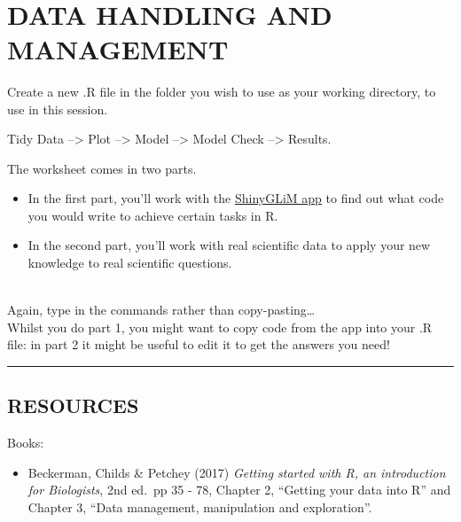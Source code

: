 \documentclass[
]{book}
\providecommand{\tightlist}{%
  \setlength{\itemsep}{0pt}\setlength{\parskip}{0pt}}
\begin{document}
~
~

\hypertarget{data-handling-and-management}{%
\chapter{DATA HANDLING AND MANAGEMENT}\label{data-handling-and-management}}

Create a new .R file in the folder you wish to use as your working directory, to
use in this session.

Tidy Data --\textgreater{} Plot --\textgreater{} Model --\textgreater{} Model Check --\textgreater{} Results.

The worksheet comes in two parts.

\begin{itemize}
\tightlist
\item
  In the first part, you'll work with the
  \href{https://iainmstott.shinyapps.io/ShinyGLiM}{ShinyGLiM app}
  to find out what code you would write to achieve certain tasks in R.
\item
  In the second part,
  you'll work with real scientific data to apply your new knowledge to real scientific
  questions.\\
  ~\\
\end{itemize}

Again, type in the commands rather than copy-pasting\ldots{}\\

Whilst you do part 1, you might want to copy code from the app into your .R
file: in part 2 it might be useful to edit it to get the answers you need!\\

\begin{center}\rule{0.5\linewidth}{0.5pt}\end{center}

\hypertarget{resources}{%
\section{RESOURCES}\label{resources}}

Books:

\begin{itemize}
\tightlist
\item
  Beckerman, Childs \& Petchey (2017) \emph{Getting started with R, an
  introduction for Biologists}, 2nd ed.~pp 35 - 78, Chapter 2, ``Getting your
  data into R'' and Chapter 3, ``Data management, manipulation and exploration''.
  ~
\end{itemize}
\end{document}
